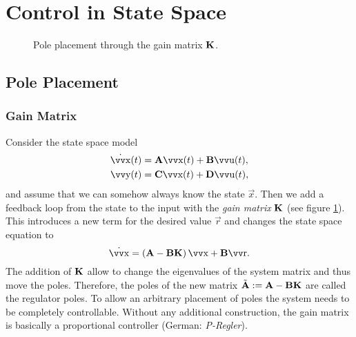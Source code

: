 
\section{Control in State Space}

\begin{figure}
	\centering
	\resizebox{\linewidth}{!}{
		
	}
	\caption{
		Pole placement through the gain matrix \(\bm{\mathrm{K}}\).
		\label{fig:ss-pole-placement}
	}
\end{figure}

\subsection{Pole Placement}

\subsubsection{Gain Matrix}

Consider the state space model
\begin{align*}
	\dot{\vec{x}}(t) & = \mx{A} \vec{x}(t) + \mx{B} \vec{u}(t), \\
	\vec{y}(t)       & = \mx{C} \vec{x}(t) + \mx{D} \vec{u}(t),
\end{align*}
and assume that we can somehow always know the state \(\vec{x}\). Then we add a feedback loop from the state to the input with the \emph{gain matrix} \(\bm{\mathrm{K}}\) (see figure \ref{fig:ss-pole-placement}). This introduces a new term for the desired value \(\vec{r}\) and changes the state space equation to
\[
	\dot{\vec{x}} = \left(\mx{A} - \mx{B}\mx{K}\right) \vec{x} + \mx{B}\vec{r}.
\]
The addition of \(\bm{\mathrm{K}}\) allow to change the eigenvalues of the system matrix and thus move the poles. Therefore, the poles of the new matrix \(\tilde{\bm{\mathrm{A}}} := \bm{\mathrm{A}} - \bm{\mathrm{B}}\bm{\mathrm{K}}\) are called the regulator poles. To allow an arbitrary placement of poles the system needs to be completely controllable. Without any additional construction, the gain matrix is basically a proportional controller (German: \textsl{P-Regler}).


